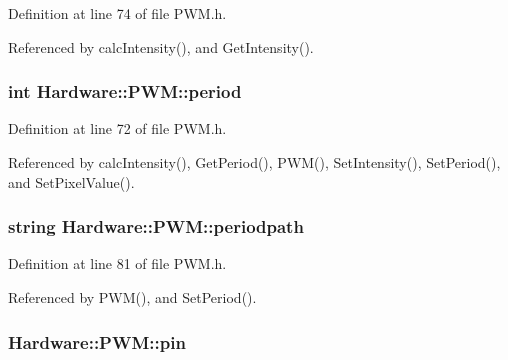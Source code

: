 Definition at line 74 of file P\+W\+M.\+h.



Referenced by calc\+Intensity(), and Get\+Intensity().

\hypertarget{class_hardware_1_1_p_w_m_a91323a511e37d396f46d08f4159ef761}{}
\subsubsection[{period}]{\setlength{\rightskip}{0pt plus 5cm}int Hardware\+::\+P\+W\+M\+::period\hspace{0.3cm}{\ttfamily [private]}}\label{class_hardware_1_1_p_w_m_a91323a511e37d396f46d08f4159ef761}


Definition at line 72 of file P\+W\+M.\+h.



Referenced by calc\+Intensity(), Get\+Period(), P\+W\+M(), Set\+Intensity(), Set\+Period(), and Set\+Pixel\+Value().

\hypertarget{class_hardware_1_1_p_w_m_a27e17a6c2e9720c571d5939f1a9ffb12}{}
\subsubsection[{periodpath}]{\setlength{\rightskip}{0pt plus 5cm}string Hardware\+::\+P\+W\+M\+::periodpath\hspace{0.3cm}{\ttfamily [private]}}\label{class_hardware_1_1_p_w_m_a27e17a6c2e9720c571d5939f1a9ffb12}


Definition at line 81 of file P\+W\+M.\+h.



Referenced by P\+W\+M(), and Set\+Period().

\hypertarget{class_hardware_1_1_p_w_m_a47a155962c7c376bf1fe27c15c1e1e1d}{}
\subsubsection[{pin}]{ Hardware\+::\+P\+W\+M\+::pin}\label{class_hardware_1_1_p_w_m_a47a155962c7c376bf1fe27c15c1e1e1d}


